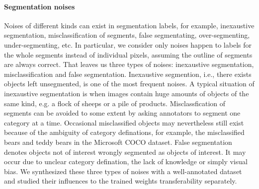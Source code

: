 

\paragraph{Segmentation noises}
Noises of different kinds can exist in segmentation labels, for example, inexaustive segmentation, misclassification of segments, false segmentating, over-segmenting, under-segmenting, etc.
In particular, we consider only noises happen to labels for the whole segments instead of individual pixels, assuming the outline of segments are always correct.
That leaves us three types of noises: inexaustive segmentation, misclassification and false segmentation.
Inexaustive segmention, i.e., there exists objects left unsegmented, is one of the most frequent noises.
A typical situation of inexaustive segmentation is when images contain huge amounts of objects of the same kind, e.g. a flock of sheeps or a pile of products.
Misclassfication of segments can be avoided to some extent by asking annotators to segment one category at a time.\cite{lin2014microsoft}
Occasional misclassified objects may nevertheless still exist because of the ambiguity of category definations, for example, the misclassified bears and teddy bears in the Microsoft COCO dataset.
False segmentation denotes objects not of interest wrongly segmented as objects of interest.
It may occur due to unclear category defination, the lack of knowledge or simply visual bias.
We synthesized these three types of noises with a well-annotated dataset and studied their influences to the trained weights transferability separately.




